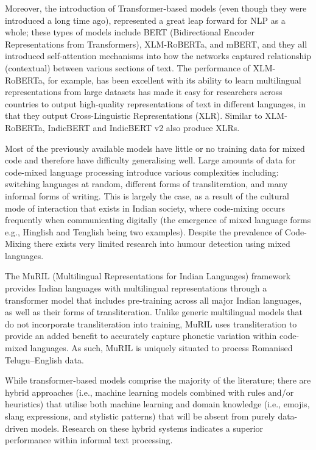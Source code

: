 \documentclass[conference]{IEEEtran}
\begin{document}
Moreover, the introduction of Transformer-based models (even though they were introduced a long time ago), represented a great leap forward for NLP as a whole; these types of models include BERT (Bidirectional Encoder Representations from Transformers), XLM-RoBERTa, and mBERT, and they all introduced self-attention mechanisms into how the networks captured relationship (contextual) between various sections of text. The performance of XLM-RoBERTa, for example, has been excellent with its ability to learn multilingual representations from large datasets has made it easy for researchers across countries to output high-quality representations of text in different languages, in that they output Cross-Linguistic Representations (XLR). Similar to XLM-RoBERTa, IndicBERT and IndicBERT v2 also produce XLRs.

Most of the previously available models have little or no training data for mixed code and therefore have difficulty generalising well. Large amounts of data for code-mixed language processing introduce various complexities including: switching languages at random, different forms of transliteration, and many informal forms of writing. This is largely the case, as a result of the cultural mode of interaction that exists in Indian society, where code-mixing occurs frequently when communicating digitally (the emergence of mixed language forms e.g., Hinglish and Tenglish being two examples). Despite the prevalence of Code-Mixing there exists very limited research into humour detection using mixed languages.

The MuRIL (Multilingual Representations for Indian Languages) framework provides Indian languages with multilingual representations through a transformer model that includes pre-training across all major Indian languages, as well as their forms of transliteration. Unlike generic multilingual models that do not incorporate transliteration into training, MuRIL uses transliteration to provide an added benefit to accurately capture phonetic variation within code-mixed languages. As such, MuRIL is uniquely situated to process Romanised Telugu–English data.

While transformer-based models comprise the majority of the literature; there are hybrid approaches (i.e., machine learning models combined with rules and/or heuristics) that utilise both machine learning and domain knowledge (i.e., emojis, slang expressions, and stylistic patterns) that will be absent from purely data-driven models. Research on these hybrid systems indicates a superior performance within informal text processing.
\end{document}
